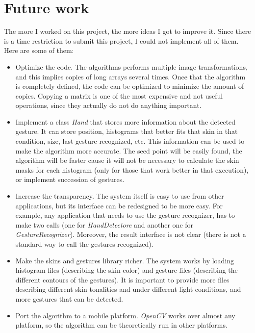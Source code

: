 \documentclass[11pt,a4paper]{article}
\begin{document}
\section{Future work}
The more I worked on this project, the more ideas I got to improve it. Since there is a time restriction to submit this project, I could not implement all of them. Here are some of them:
\begin{itemize}
\item Optimize the code. The algorithms performs multiple image transformations, and this implies copies of long arrays several times. Once that the algorithm is completely defined, the code can be optimized to minimize the amount of copies. Copying a matrix is one of the most expensive and not useful operations, since they actually do not do anything important.

\item Implement a class \textit{Hand} that stores more information about the detected gesture. It can store position, histograms that better fits that skin in that condition, size, last gesture recognized, etc. This information can be used to make the algorithm more accurate. The seed point will be easily found, the algorithm will be faster cause it will not be necessary to calculate the skin masks for each histogram (only for those that work better in that execution), or implement succession of gestures.

\item Increase the transparency. The system itself is easy to use from other applications, but its interface can be redesigned to be more easy. For example, any application that needs to use the gesture recognizer, has to make two calls (one for \textit{HandDetectore} and another one for \textit{GestureRecognizer}). Moreover, the result interface is not clear (there is not a standard way to call the gestures recognized).

\item Make the skins and gestures library richer. The system works by loading histogram files (describing the skin color) and gesture files (describing the different contours of the gestures). It is important to provide more files describing different skin tonalities and under different light conditions, and more gestures that can be detected.

\item Port the algorithm to a mobile platform. \textit{OpenCV} works over almost any platform, so the algorithm can be theoretically run in other platforms.

\end{itemize}

  

\end{document}
